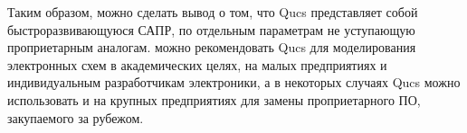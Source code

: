 \documentclass[10pt, a5paper]{article}
\begin{document}
Таким образом, можно сделать вывод о том, что Qucs представляет собой 
быстроразвивающуюся САПР, по отдельным параметрам не уступающую проприетарным аналогам.  
можно рекомендовать Qucs для моделирования электронных схем в академических 
целях, на малых предприятиях и индивидуальным разработчикам электроники, а в 
некоторых случаях Qucs можно использовать и на крупных предприятиях для замены проприетарного ПО, закупаемого за рубежом.
\end{document}
